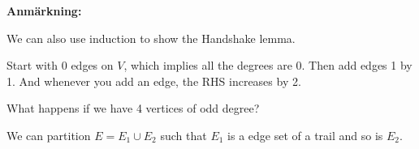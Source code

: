\par\bigskip
\noindent\textbf{Anmärkning:}\par
\noindent We can also use induction to show the Handshake lemma.\par
\noindent Start with 0 edges on $V$, which implies all the degrees are 0. Then add edges 1 by 1. And whenever you add an edge, the RHS increases by 2.
\par\bigskip
\noindent What happens if we have 4 vertices of odd degree?\par
\noindent We can partition $E = E_1\cup E_2$ such that $E_1$ is a edge set of a trail and so is $E_2$.
